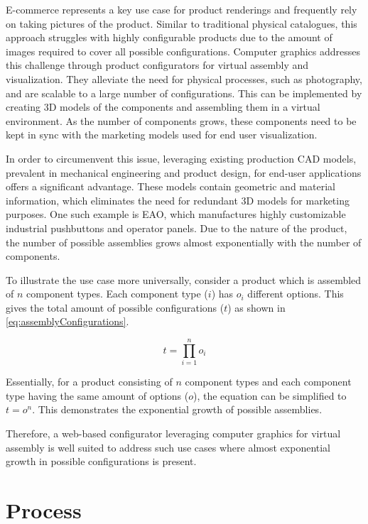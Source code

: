 E-commerce represents a key use case for product renderings and frequently rely on taking pictures of the product. Similar to traditional physical catalogues, this approach struggles with highly configurable products due to the amount of images required to cover all possible configurations. Computer graphics addresses this challenge through product configurators for virtual assembly and visualization. They alleviate the need for physical processes, such as photography, and are scalable to a large number of configurations. This can be implemented by creating 3D models of the components and assembling them in a virtual environment. As the number of components grows, these components need to be kept in sync with the marketing models used for end user visualization.

In order to circumenvent this issue, leveraging existing production \gls{CAD} models, prevalent in mechanical engineering and product design, for end-user applications offers a significant advantage. These models contain geometric and material information, which eliminates the need for redundant 3D models for marketing purposes. One such example is EAO, which manufactures highly customizable industrial pushbuttons and operator panels. Due to the nature of the product, the number of possible assemblies grows almost exponentially with the number of components.

To illustrate the use case more universally, consider a product which is assembled of $n$ component types. Each component type ($i$) has $o_i$ different options. This gives the total amount of possible configurations ($t$) as shown in \autoref{eq:assemblyConfigurations}.

\begin{equation}
  t = \prod_{i=1}^n o_i
  \label{eq:assemblyConfigurations}
\end{equation}

Essentially, for a product consisting of $n$ component types and each component type having the same amount of options ($o$), the equation can be simplified to $t = o^n$. This demonstrates the exponential growth of possible assemblies.

Therefore, a web-based configurator leveraging computer graphics for virtual assembly is well suited to address such use cases where almost exponential growth in possible configurations is present.

\section{Process}

